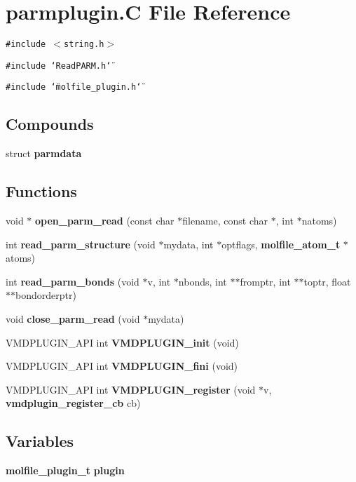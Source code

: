 \section{parmplugin.C File Reference}
\label{parmplugin_8C}
{\tt \#include $<$string.h$>$}\par
{\tt \#include \char`\"{}Read\-PARM.h\char`\"{}}\par
{\tt \#include \char`\"{}molfile\_\-plugin.h\char`\"{}}\par
\subsection*{Compounds}
\begin{CompactItemize}
\item 
struct {\bf parmdata}
\end{CompactItemize}
\subsection*{Functions}
\begin{CompactItemize}
\item 
void $\ast$ {\bf open\_\-parm\_\-read} (const char $\ast$filename, const char $\ast$, int $\ast$natoms)
\item 
int {\bf read\_\-parm\_\-structure} (void $\ast$mydata, int $\ast$optflags, {\bf molfile\_\-atom\_\-t} $\ast$atoms)
\item 
int {\bf read\_\-parm\_\-bonds} (void $\ast$v, int $\ast$nbonds, int $\ast$$\ast$fromptr, int $\ast$$\ast$toptr, float $\ast$$\ast$bondorderptr)
\item 
void {\bf close\_\-parm\_\-read} (void $\ast$mydata)
\item 
VMDPLUGIN\_\-API int {\bf VMDPLUGIN\_\-init} (void)
\item 
VMDPLUGIN\_\-API int {\bf VMDPLUGIN\_\-fini} (void)
\item 
VMDPLUGIN\_\-API int {\bf VMDPLUGIN\_\-register} (void $\ast$v, {\bf vmdplugin\_\-register\_\-cb} cb)
\end{CompactItemize}
\subsection*{Variables}
\begin{CompactItemize}
\item 
{\bf molfile\_\-plugin\_\-t} {\bf plugin}
\end{CompactItemize}


